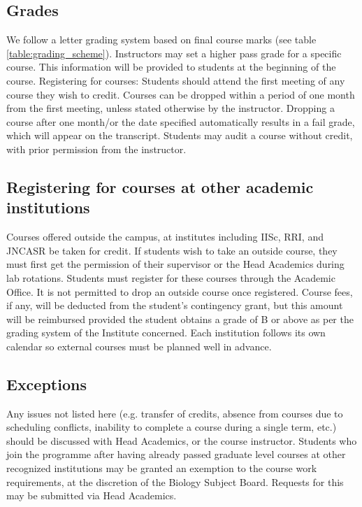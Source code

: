 \documentclass[a4paper,10pt]{article}
\begin{document}
\subsection{Grades}
We follow a letter grading system based on final course marks (see table
\ref{table:grading_scheme}).
Instructors may set a higher pass grade for a specific course. This information will be
provided to students at the beginning of the course.
Registering for courses: Students should attend the first meeting of any course they wish to
credit. Courses can be dropped within a period of one month from the first meeting, unless
stated otherwise by the instructor. Dropping a course after one month/or the date specified
automatically results in a fail grade, which will appear on the transcript. Students may audit
a course without credit, with prior permission from the instructor.

\subsection{Registering for courses at other academic institutions} Courses
offered outside the campus, at institutes including IISc, RRI, and JNCASR be
taken for credit. If students wish to take an outside course, they must first
get the permission of their supervisor or the Head Academics during lab
rotations. Students must register for these courses through the Academic Office.
It is not permitted to drop an outside course once registered. Course fees, if
any, will be deducted from the student’s contingency grant, but this amount will
be reimbursed provided the student obtains a grade of B or above as per the
grading system of the Institute concerned. Each institution follows its own
calendar so external courses must be planned well in advance.

\subsection{Exceptions} Any issues not listed here (e.g. transfer of credits,
absence from courses due to scheduling conflicts, inability to complete a course
during a single term, etc.) should be discussed with Head Academics, or the
course instructor. Students who join the programme after having already passed
graduate level courses at other recognized institutions may be granted an
exemption to the course work requirements, at the discretion of the Biology
Subject Board. Requests for this may be submitted via Head Academics. 
\end{document}
